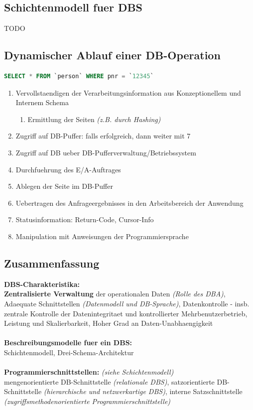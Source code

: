 \documentclass[a4paper,10pt]{article}
\begin{document}
\subsection{Schichtenmodell fuer DBS}
TODO

\subsection{Dynamischer Ablauf einer DB-Operation}
\begin{lstlisting}[language=SQL]
SELECT * FROM `person` WHERE pnr = `12345`
\end{lstlisting}

\begin{enumerate}
\item Vervollstaendigen der Verarbeitungsinformation aus Konzeptionellem und Internem Schema
\begin{enumerate}
\item Ermittlung der Seiten \emph{(z.B. durch Hashing)}
\end{enumerate}
\item Zugriff auf DB-Puffer: falls erfolgreich, dann weiter mit 7
\item Zugriff auf DB ueber DB-Pufferverwaltung/Betriebssystem
\item Durchfuehrung des E/A-Auftrages
\item Ablegen der Seite im DB-Puffer
\item Uebertragen des Anfrageergebnisses in den Arbeitsbereich der Anwendung
\item Statusinformation: Return-Code, Cursor-Info
\item Manipulation mit Anweisungen der Programmiersprache
\end{enumerate}

\subsection{Zusammenfassung}
\textbf{DBS-Charakteristika:}\\
\textbf{Zentralisierte Verwaltung} der operationalen Daten \emph{(Rolle des DBA)}, Adaequate Schnittstellen \emph{(Datenmodell und DB-Sprache)}, Datenkontrolle - insb. zentrale Kontrolle der Datenintegritaet und kontrollierter Mehrbenutzerbetrieb, Leistung und Skalierbarkeit, Hoher Grad an Daten-Unabhaengigkeit
\\~\\
\textbf{Beschreibungsmodelle fuer ein DBS:}\\
Schichtenmodell, Drei-Schema-Architektur
\\~\\
\textbf{Programmierschnittstellen:} \emph{(siehe Schichtenmodell)}\\
mengenorientierte DB-Schnittstelle \emph{(relationale DBS)}, satzorientierte DB-Schnittstelle \emph{(hierarchische und netzwerkartige DBS)}, interne Satzschnittstelle \emph{(zugriffsmethodenorientierte Programmierschnittstelle)}
\end{document}
